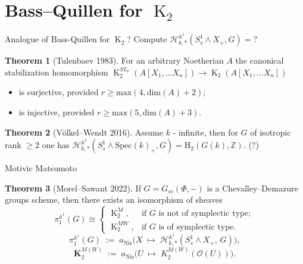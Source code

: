 \documentclass[handout]{beamer} %
\DeclareMathOperator{\K}{K}
\theoremstyle{definition}
\newtheorem*{thm}{Theorem}
\begin{document}
\section{Bass--Quillen for $\K_2$}

\begin{frame} \tableofcontents[currentsection] \end{frame}

\begin{frame}{Analogue of Bass-Quillen for $\K_2$?}
Compute $\mathcal{H}_{k,*}^{\mathbb{A}^1}(S^1_s \wedge X_+, G) = ?$
\pause

\begin{thm}[Tulenbaev 1983]
  For an arbitrary Noetherian $A$ the canonical stabilization homomorphism
  $\K_2^{SL_r}(A[X_1, \ldots X_n]) \to \K_2(A[X_1, \ldots X_n])$
  \begin{itemize}
   \item is surjective, provided $r \geq \mathrm{max}(4, \mathrm{dim}(A) + 2)$;
   \pause
   \item is injective, provided $r \geq \mathrm{max}(5, \mathrm{dim}(A) + 3)$.
  \end{itemize}
\end{thm}
\pause


\begin{thm}[V\"olkel--Wendt 2016]
 Assume $k$ - infinite, then for $G$ of isotropic rank $\geq 2$ one has $\mathcal{H}_{k,*}^{\mathbb{A}^1}(S^1_s \wedge \mathrm{Spec}(k)_+, G) = \mathrm{H}_2(G(k), \mathbb{Z})$. (?)
\end{thm}

\end{frame}

\begin{frame}{Motivic Matsumoto}
 \begin{thm} [Morel--Sawant 2022]
If $G = G_{sc}(\Phi, -)$ is a Chevalley--Demazure groups scheme, then there exists an isomorphism of sheaves
\[ \pi_{1}^{\mathbb{A}^1}(G) \cong
\begin{cases}
\K_2^{M}, & \text{if $G$ is not of symplectic type};\\
\K_2^{MW}, & \text{if $G$ is of symplectic type}.
\end{cases} \]
\pause
\[ \pi_1^{\mathbb{A}^1}(G) \;:=\; a_{\mathrm{Nis}} \Big( X \;\longmapsto\; \mathcal{H}^{\mathbb{A}^1}_ {k, *}(S^1_s \wedge X_+,\, G) \Big), \]
\pause
\[ \mathbf{K}_2^{M(W)} \;:=\; a_{\mathrm{Nis}} \Big( U \;\longmapsto\; K_2^{M(W)}(\mathcal{O}(U)) \Big). \]
\end{thm}
\end{frame}
\end{document}
